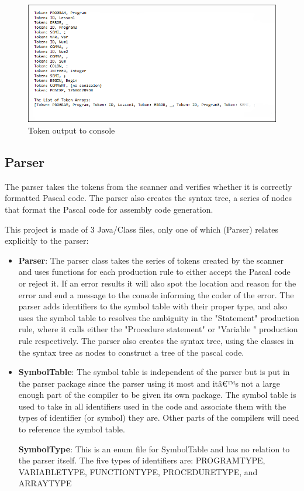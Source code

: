 \documentclass[english]{article}
\begin{document}
\begin{figure}
\begin{center}
\includegraphics[width=1\textwidth]{output.PNG}
\end{center}
\caption{\label{Output}Token output to console}
\end{figure}


\subsection{Parser}

The parser takes the tokens from the scanner and verifies whether it is correctly formatted Pascal code. The parser also creates the syntax tree, a series of nodes that format the Pascal code for assembly code generation.

This project is made of 3 Java/Class files, only one of which (Parser) relates explicitly to the parser:

\begin{itemize}

\item
\textbf{Parser}: The parser class takes the series of tokens created by the scanner and uses functions for each production rule to either accept the Pascal code or reject it. If an error results it will also spot the location and reason for the error and end a message to the console informing the coder of the error. The parser adds identifiers to the symbol table with their proper type, and also uses the symbol table to resolves the ambiguity in the "Statement" production rule, where it calls either the "Procedure statement" or "Variable " production rule respectively. The parser also creates the syntax tree, using the classes in the syntax tree as nodes to construct a tree of the pascal code.

\item
\textbf{SymbolTable}: The symbol table is independent of the parser but is put in the parser package since the parser using it most and itâ€™s not a large enough part of the compiler to be given its own package. The symbol table is used to take in all identifiers used in the code and associate them with the types of identifier (or symbol) they are. Other parts of the compilers will need to reference the symbol table.

\textbf{SymbolType}: This is an enum file for SymbolTable and has no relation to the parser itself. The five types of identifiers are: PROGRAMTYPE, VARIABLETYPE, FUNCTIONTYPE, PROCEDURETYPE, and ARRAYTYPE

\end{itemize}
\end{document}
